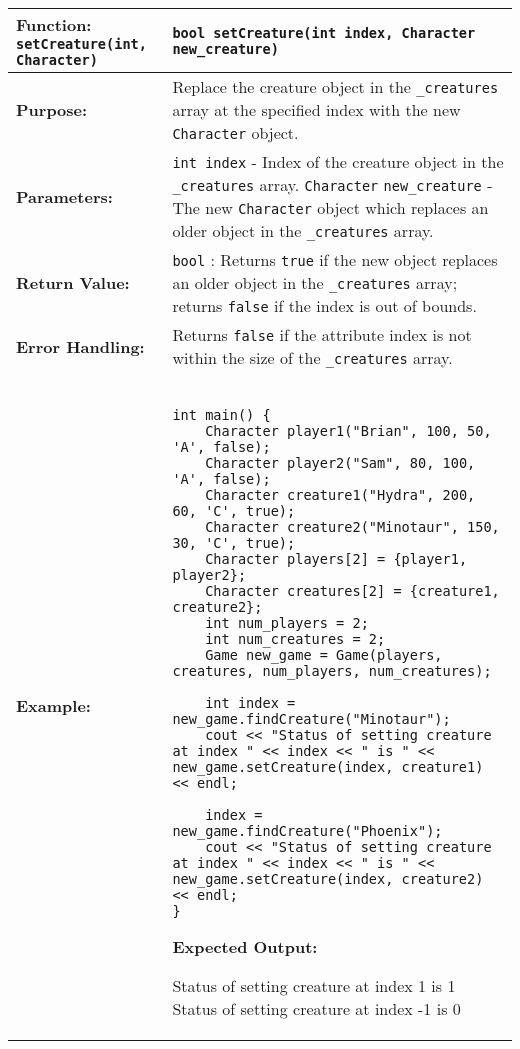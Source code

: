 \renewcommand{\arraystretch}{1.5}
\begin{longtable}{|p{2.0in}|p{4.0in}|}
\hline
\textbf{Function:} \texttt{setCreature(int, Character)} & \texttt{bool setCreature(int index, Character new_creature)} \\ \hline

\textbf{Purpose:} & Replace the creature object in the \texttt{_creatures} array at the specified index with the new \texttt{Character} object. \\ \hline

\textbf{Parameters:} & 
\texttt{int index} - Index of the creature object in the \texttt{_creatures} array. \newline
\texttt{Character} \texttt{new_creature} - The new \texttt{Character} object which replaces an older object in the \texttt{_creatures} array. \\ \hline

\textbf{Return Value:} & \texttt{bool} : Returns \texttt{true} if the new object replaces an older object in the \texttt{_creatures} array; returns \texttt{false} if the index is out of bounds. \\ \hline

\textbf{Error Handling:} & 
Returns \texttt{false} if the attribute index is not within the size of the \texttt{_creatures} array. \\ \hline

\textbf{Example:} & 

\begin{example}
\begin{verbatim}

int main() {
    Character player1("Brian", 100, 50, 'A', false);
    Character player2("Sam", 80, 100, 'A', false);
    Character creature1("Hydra", 200, 60, 'C', true);
    Character creature2("Minotaur", 150, 30, 'C', true);
    Character players[2] = {player1, player2};
    Character creatures[2] = {creature1, creature2};
    int num_players = 2;
    int num_creatures = 2;
    Game new_game = Game(players, creatures, num_players, num_creatures);

    int index = new_game.findCreature("Minotaur");
    cout << "Status of setting creature at index " << index << " is " << new_game.setCreature(index, creature1) << endl;

    index = new_game.findCreature("Phoenix");
    cout << "Status of setting creature at index " << index << " is " << new_game.setCreature(index, creature2) << endl;
}
\end{verbatim}
\end{example}

\textbf{Expected Output:} 

\vspace{5pt}
Status of setting creature at index 1 is 1 \newline
Status of setting creature at index -1 is 0
\vspace{5pt}
\\ \hline
\end{longtable}

